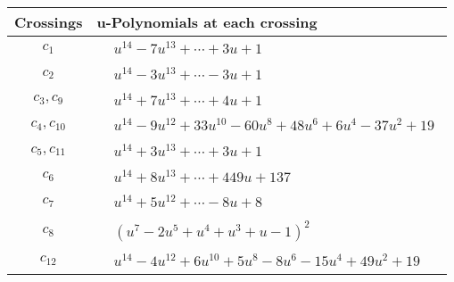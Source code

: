 \documentclass[1p]{elsarticle_modified}
\theoremstyle{definition}
\begin{document}
\begin{tabular}{m{50pt}|m{274pt}}
Crossings & \hspace{64pt}u-Polynomials at each crossing \\
\hline $$\begin{aligned}c_{1}\end{aligned}$$&$\begin{aligned}
&u^{14}-7 u^{13}+\cdots+3 u+1
\end{aligned}$\\
\hline $$\begin{aligned}c_{2}\end{aligned}$$&$\begin{aligned}
&u^{14}-3 u^{13}+\cdots-3 u+1
\end{aligned}$\\
\hline $$\begin{aligned}c_{3},c_{9}\end{aligned}$$&$\begin{aligned}
&u^{14}+7 u^{13}+\cdots+4 u+1
\end{aligned}$\\
\hline $$\begin{aligned}c_{4},c_{10}\end{aligned}$$&$\begin{aligned}
&u^{14}-9 u^{12}+33 u^{10}-60 u^8+48 u^6+6 u^4-37 u^2+19
\end{aligned}$\\
\hline $$\begin{aligned}c_{5},c_{11}\end{aligned}$$&$\begin{aligned}
&u^{14}+3 u^{13}+\cdots+3 u+1
\end{aligned}$\\
\hline $$\begin{aligned}c_{6}\end{aligned}$$&$\begin{aligned}
&u^{14}+8 u^{13}+\cdots+449 u+137
\end{aligned}$\\
\hline $$\begin{aligned}c_{7}\end{aligned}$$&$\begin{aligned}
&u^{14}+5 u^{12}+\cdots-8 u+8
\end{aligned}$\\
\hline $$\begin{aligned}c_{8}\end{aligned}$$&$\begin{aligned}
&(u^7-2 u^5+u^4+u^3+u-1)^2
\end{aligned}$\\
\hline $$\begin{aligned}c_{12}\end{aligned}$$&$\begin{aligned}
&u^{14}-4 u^{12}+6 u^{10}+5 u^8-8 u^6-15 u^4+49 u^2+19
\end{aligned}$\\
\hline
\end{tabular}\\~\\
\end{document}
